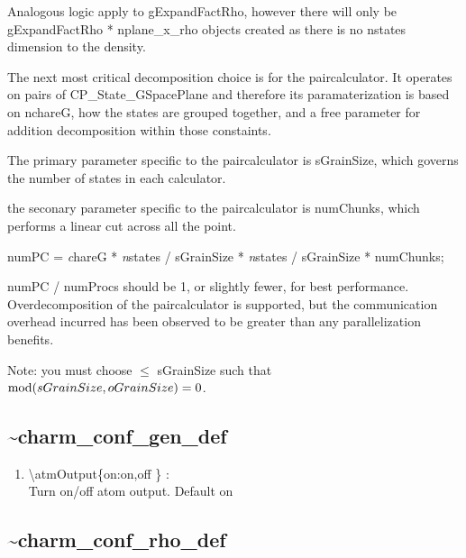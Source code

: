\documentclass[12pt,titlepage]{article}
\begin{document}
Analogous logic apply to gExpandFactRho, however there will only be
gExpandFactRho * nplane\_x\_rho objects created as there is no nstates
dimension to the density.

The next most critical decomposition choice is for the paircalculator.
It operates on pairs of CP\_State\_GSpacePlane and therefore its
paramaterization is based on nchareG, how the states are grouped
together, and a free parameter for addition decomposition within those
constaints.

The primary parameter specific to the paircalculator is sGrainSize, which governs the number of states in each calculator.

the seconary parameter specific to the paircalculator is numChunks, which performs a linear cut across all the point.

numPC = {\emph chareG} * {\emph nstates / sGrainSize} * {\emph nstates / sGrainSize} * numChunks;

numPC / numProcs should be 1, or slightly fewer, for best performance.  Overdecomposition of the paircalculator is supported, but the communication overhead incurred has been observed to be greater than any parallelization benefits. 

Note: you must choose $\leq$ sGrainSize such that ${\rm
  mod}(sGrainSize,oGrainSize)=0$.

\newpage
\subsection*{\bf \~{ }charm\_conf\_gen\_def}

\begin{enumerate}
  \vspace{0.15in} 
  \item  \textbackslash{}atmOutput\{on:on,off \} : \\   
  Turn on/off atom output. Default on
\end{enumerate}

\newpage
\subsection*{\bf \~{ }charm\_conf\_rho\_def}
\end{document}
